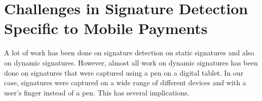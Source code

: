\documentclass[a4paper, oneside]{csthesis}
\begin{document}














\section{Challenges in Signature Detection Specific to Mobile Payments}

A lot of work has been done on signature detection on static signatures and also on dynamic signatures. However, almost all work on dynamic signatures has been done on signatures that were captured using a pen on a digital tablet. In our case, signatures were captured on a wide range of different devices and with a user's finger instead of a pen. This has several implications.
\end{document}
